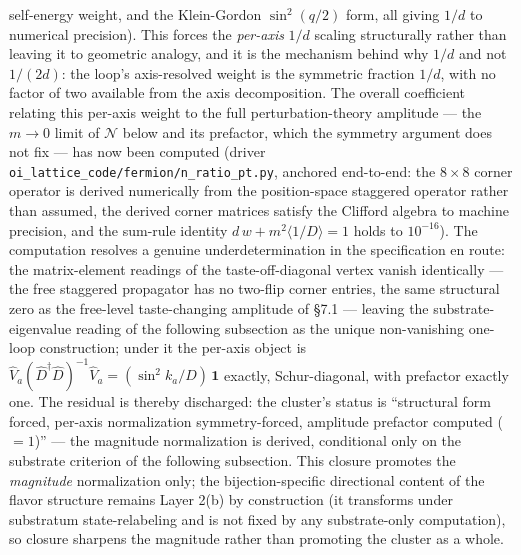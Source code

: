 \documentclass[
]{article}
\begin{document}
self-energy weight, and the Klein-Gordon \(\sin^2(q/2)\) form, all
giving \(1/d\) to numerical precision). This forces the \emph{per-axis}
\(1/d\) scaling structurally rather than leaving it to geometric
analogy, and it is the mechanism behind why \(1/d\) and not \(1/(2d)\):
the loop's axis-resolved weight is the symmetric fraction \(1/d\), with
no factor of two available from the axis decomposition. The overall
coefficient relating this per-axis weight to the full
perturbation-theory amplitude --- the \(m \to 0\) limit of
\(\mathcal{N}\) below and its prefactor, which the symmetry argument
does not fix --- has now been computed (driver
\texttt{oi\_lattice\_code/fermion/n\_ratio\_pt.py}, anchored end-to-end:
the \(8\times 8\) corner operator is derived numerically from the
position-space staggered operator rather than assumed, the derived
corner matrices satisfy the Clifford algebra to machine precision, and
the sum-rule identity \(d\,w + m^2\langle 1/D\rangle = 1\) holds to
\(10^{-16}\)). The computation resolves a genuine underdetermination in
the specification en route: the matrix-element readings of the
taste-off-diagonal vertex vanish identically --- the free staggered
propagator has no two-flip corner entries, the same structural zero as
the free-level taste-changing amplitude of §7.1 --- leaving the
substrate-eigenvalue reading of the following subsection as the unique
non-vanishing one-loop construction; under it the per-axis object is
\(\hat V_a (\hat D^\dagger \hat D)^{-1} \hat V_a = (\sin^2 k_a/D)\,\mathbf{1}\)
exactly, Schur-diagonal, with prefactor exactly one. The residual is
thereby discharged: the cluster's status is ``structural form forced,
per-axis normalization symmetry-forced, amplitude prefactor computed
(\(=1\))'' --- the magnitude normalization is derived, conditional only
on the substrate criterion of the following subsection. This closure
promotes the \emph{magnitude} normalization only; the bijection-specific
directional content of the flavor structure remains Layer 2(b) by
construction (it transforms under substratum state-relabeling and is not
fixed by any substrate-only computation), so closure sharpens the
magnitude rather than promoting the cluster as a whole.
\end{document}
